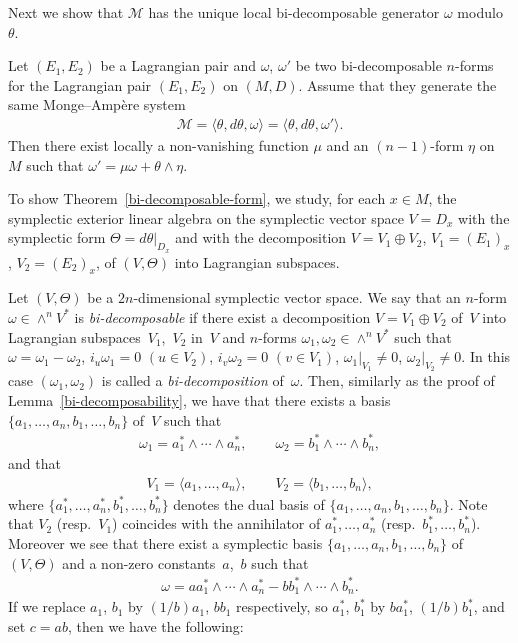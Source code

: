 Next we show that $\mathcal{M}$ has the unique
local bi-decomposable generator $\omega$ modulo $\theta$.

\begin{Th}
\label{bi-decomposable-form}
Let $(E_1, E_2)$ be a Lagrangian pair and
$\omega$, $\omega'$ be two bi-decomposable $n$-forms
for the Lagrangian pair $(E_1, E_2)$ on $(M, D)$.
Assume that they generate the same Monge--Amp{\`e}re system
\begin{gather*}
{\mathcal M} =
\langle \theta, d\theta, \omega \rangle
=
\langle \theta, d\theta, \omega' \rangle.
\end{gather*}
Then there exist
locally a non-vanishing function $\mu$ and an $(n-1)$-form $\eta$
on $M$ such that $\omega' = \mu \omega + \theta \wedge \eta$.
\end{Th}

To show Theorem~\ref{bi-decomposable-form},
we study, for each $x \in M$, the symplectic exterior linear algebra
on the symplectic vector space $V = D_x$ with the symplectic form
$\Theta = d\theta\vert_{D_x}$ and with the decomposition
$V = V_1\oplus V_2$, $V_1 = (E_1)_x$, $V_2 = (E_2)_x$,
of $(V, \Theta)$ into Lagrangian subspaces.


Let $(V,\Theta)$ be a $2n$-dimensional symplectic vector space.
We say that an $n$-form $\omega \in \wedge^n V^*$ is
{\it bi-decomposable} if
there exist a decomposition $V = V_1\oplus V_2$ of~$V$ into
Lagrangian sub\-spa\-ces~$V_1$,~$V_2$ in~$V$ and
$n$-forms $\omega_1, \omega_2 \in \wedge^n V^*$ such
that $\omega = \omega_1 - \omega_2$,
$i_u\omega_1 = 0$ $(u \in V_2)$, $i_v\omega_2 = 0$ $(v \in V_1)$,
$\omega_1\vert_{V_1} \not= 0$, $\omega_2\vert_{V_2} \not= 0$.
In this case $(\omega_1, \omega_2)$ is called a {\it bi-decomposition}
of~$\omega$.
Then, similarly as the proof of Lemma~\ref{bi-decomposability}, we have that
there exists a basis
$\{ a_1,\dots, a_n, b_1,\dots, b_n\}$ of~$V$
such that
\begin{gather*}
\omega_1 = a_1^*\wedge \cdots \wedge a_n^*, \qquad
\omega_2 = b_1^*\wedge \cdots \wedge b_n^*,
\end{gather*}
and that
\begin{gather*}
V_1= \langle a_1,\dots, a_n\rangle,
\qquad
V_2= \langle b_1,\dots, b_n\rangle,
\end{gather*}
where $\{ a_1^*,\dots, a_n^*, b_1^*,\dots, b_n^*\}$ denotes the dual basis
of $\{ a_1,\dots, a_n, b_1,\dots, b_n\}$.
Note that
$V_2$ (resp.~$V_1$) coincides with the annihilator of $a_1^*,\dots, a_n^*$
(resp.~$b_1^*,\dots, b_n^*$).
Moreover we see that
there exist a symplectic basis $\{ a_1,\dots, a_n, b_1,\dots, b_n\}$
of $(V, \Theta)$
and a non-zero constants~$a$,~$b$ such that
\begin{gather*}
\omega =
a   a_1^*\wedge \cdots \wedge a_n^* - b   b_1^*\wedge \cdots \wedge b_n^*.
\end{gather*}
If we replace $a_1$, $b_1$ by $(1/b) a_1$, $b b_1$
respectively,
so $a_1^*$, $b_1^*$ by $b a_1^*$, $(1/b) b_1^*$,
and set $c = ab$, then we have the following:


